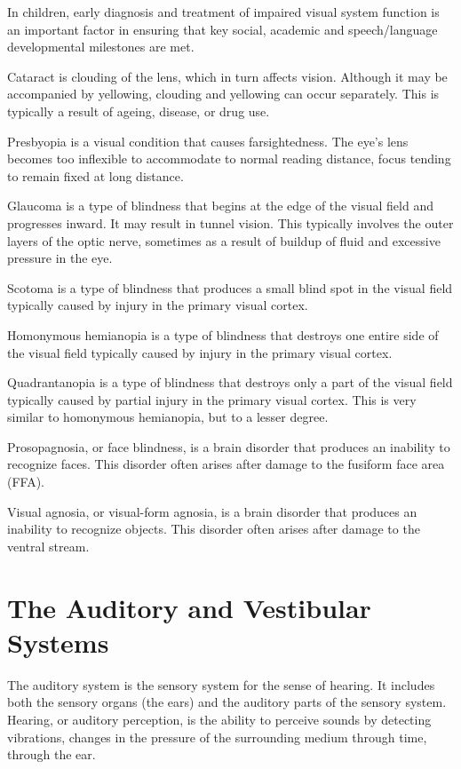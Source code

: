 In children, early diagnosis and treatment of impaired visual system function is an important factor in ensuring that key social, academic and speech/language developmental milestones are met.

Cataract is clouding of the lens, which in turn affects vision. Although it may be accompanied by yellowing, clouding and yellowing can occur separately. This is typically a result of ageing, disease, or drug use.

Presbyopia is a visual condition that causes farsightedness. The eye's lens becomes too inflexible to accommodate to normal reading distance, focus tending to remain fixed at long distance.

Glaucoma is a type of blindness that begins at the edge of the visual field and progresses inward. It may result in tunnel vision. This typically involves the outer layers of the optic nerve, sometimes as a result of buildup of fluid and excessive pressure in the eye.

Scotoma is a type of blindness that produces a small blind spot in the visual field typically caused by injury in the primary visual cortex.

Homonymous hemianopia is a type of blindness that destroys one entire side of the visual field typically caused by injury in the primary visual cortex.

Quadrantanopia is a type of blindness that destroys only a part of the visual field typically caused by partial injury in the primary visual cortex. This is very similar to homonymous hemianopia, but to a lesser degree.

Prosopagnosia, or face blindness, is a brain disorder that produces an inability to recognize faces. This disorder often arises after damage to the fusiform face area (FFA).

Visual agnosia, or visual-form agnosia, is a brain disorder that produces an inability to recognize objects. This disorder often arises after damage to the ventral stream.

\hypertarget{the-auditory-and-vestibular-systems}{%
\chapter{The Auditory and Vestibular Systems}\label{the-auditory-and-vestibular-systems}}

The auditory system is the sensory system for the sense of hearing. It includes both the sensory organs (the ears) and the auditory parts of the sensory system. Hearing, or auditory perception, is the ability to perceive sounds by detecting vibrations, changes in the pressure of the surrounding medium through time, through the ear.

